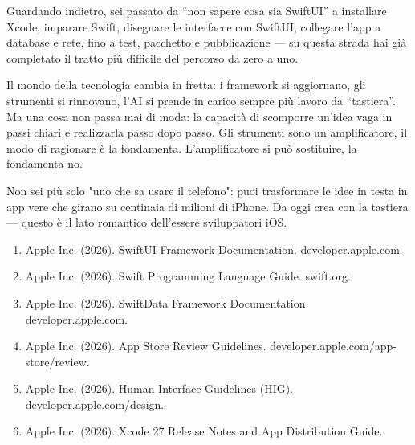 
Guardando indietro, sei passato da “non sapere cosa sia SwiftUI” a installare Xcode, imparare Swift, disegnare le interfacce con SwiftUI, collegare l'app a database e rete, fino a test, pacchetto e pubblicazione — su questa strada hai già completato il tratto più difficile del percorso da zero a uno.

Il mondo della tecnologia cambia in fretta: i framework si aggiornano, gli strumenti si rinnovano, l'AI si prende in carico sempre più lavoro da “tastiera”. Ma una cosa non passa mai di moda: la capacità di scomporre un'idea vaga in passi chiari e realizzarla passo dopo passo. Gli strumenti sono un amplificatore, il modo di ragionare è la fondamenta. L'amplificatore si può sostituire, la fondamenta no.

Non sei più solo "uno che sa usare il telefono": puoi trasformare le idee in testa in app vere che girano su centinaia di milioni di iPhone. Da oggi crea con la tastiera — questo è il lato romantico dell'essere sviluppatori iOS.


\begin{enumerate}
  \item Apple Inc. (2026). SwiftUI Framework Documentation. developer.apple.com.
  \item Apple Inc. (2026). Swift Programming Language Guide. swift.org.
  \item Apple Inc. (2026). SwiftData Framework Documentation. developer.apple.com.
  \item Apple Inc. (2026). App Store Review Guidelines. developer.apple.com/app-store/review.
  \item Apple Inc. (2026). Human Interface Guidelines (HIG). developer.apple.com/design.
  \item Apple Inc. (2026). Xcode 27 Release Notes and App Distribution Guide.
\end{enumerate}
